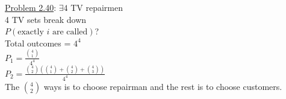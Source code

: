     \underline{Problem 2.40}: $\exists 4$ TV repairmen\\
    4 TV sets break down\\
    $P(\text{exactly } i \text{ are called})$?\\
    Total outcomes = $4^4$\\
    $P_1 = \frac{\binom{4}{1}}{4^4}$\\
    $P_2 = \frac{\binom{4}{2}(\binom{4}{1} + \binom{4}{2} + \binom{4}{3})}{4^4}$\\
    The $\binom{4}{2}$ ways is to choose repairman and the rest is to 
    choose customers.
